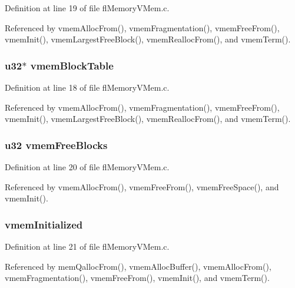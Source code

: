 Definition at line 19 of file fl\-Memory\-VMem.c.

Referenced by vmem\-Alloc\-From(), vmem\-Fragmentation(), vmem\-Free\-From(), vmem\-Init(), vmem\-Largest\-Free\-Block(), vmem\-Realloc\-From(), and vmem\-Term().
\subsubsection{\setlength{\rightskip}{0pt plus 5cm}u32$\ast$ {\bf vmem\-Block\-Table}}\label{flMemoryVMem_8h_c26d629e42eb543afddfb13534009a59}




Definition at line 18 of file fl\-Memory\-VMem.c.

Referenced by vmem\-Alloc\-From(), vmem\-Fragmentation(), vmem\-Free\-From(), vmem\-Init(), vmem\-Largest\-Free\-Block(), vmem\-Realloc\-From(), and vmem\-Term().
\subsubsection{\setlength{\rightskip}{0pt plus 5cm}u32 {\bf vmem\-Free\-Blocks}}\label{flMemoryVMem_8h_ca271688574e8c57b674a9db91d23e42}




Definition at line 20 of file fl\-Memory\-VMem.c.

Referenced by vmem\-Alloc\-From(), vmem\-Free\-From(), vmem\-Free\-Space(), and vmem\-Init().
\subsubsection{ {\bf vmem\-Initialized}}\label{flMemoryVMem_8h_f7488958314b830b42be236096a8550c}




Definition at line 21 of file fl\-Memory\-VMem.c.

Referenced by mem\-Qalloc\-From(), vmem\-Alloc\-Buffer(), vmem\-Alloc\-From(), vmem\-Fragmentation(), vmem\-Free\-From(), vmem\-Init(), and vmem\-Term().
